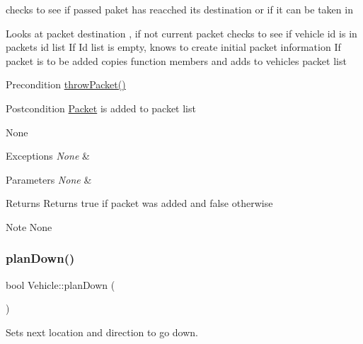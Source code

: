 checks to see if passed paket has reacched its destination or if it can be taken in 

Looks at packet destination , if not current packet checks to see if vehicle id is in packets id list If Id list is empty, knows to create initial packet information If packet is to be added copies function members and adds to vehicles packet list

\begin{DoxyPrecond}{Precondition}
\hyperlink{class_vehicle_a8858df03bffec647e3c72a58530a600b}{throw\+Packet()}
\end{DoxyPrecond}
\begin{DoxyPostcond}{Postcondition}
\hyperlink{struct_packet}{Packet} is added to packet list
\end{DoxyPostcond}
\begin{DoxyParagraph}{None}

\end{DoxyParagraph}

\begin{DoxyExceptions}{Exceptions}
{\em None} & \\
\hline
\end{DoxyExceptions}

\begin{DoxyParams}{Parameters}
{\em None} & \\
\hline
\end{DoxyParams}
\begin{DoxyReturn}{Returns}
Returns true if packet was added and false otherwise
\end{DoxyReturn}
\begin{DoxyNote}{Note}
None 
\end{DoxyNote}
\hypertarget{class_vehicle_a7da6a084ba2cf4fbe68ed3060bb712a3}{}\label{class_vehicle_a7da6a084ba2cf4fbe68ed3060bb712a3} 
\subsubsection{\texorpdfstring{plan\+Down()}{planDown()}}
{\footnotesize\ttfamily bool Vehicle\+::plan\+Down (\begin{DoxyParamCaption}{ }\end{DoxyParamCaption})\hspace{0.3cm}{\ttfamily [protected]}}



Sets next location and direction to go down. 

